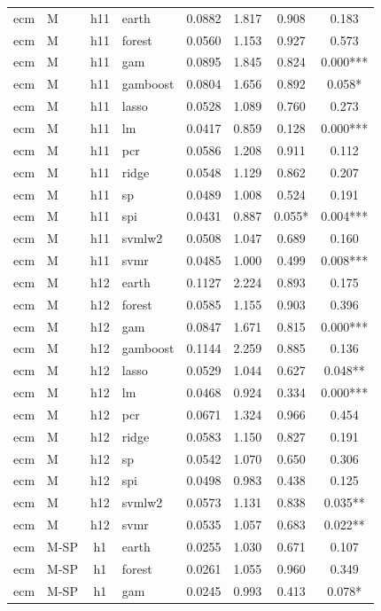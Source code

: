 \begin{ThreePartTable}
\begin{longtable}[t]{llclcccc}
\addlinespace
ecm & M & h11 & earth & 0.0882 & 1.817 & 0.908 & 0.183\\
ecm & M & h11 & forest & 0.0560 & 1.153 & 0.927 & 0.573\\
ecm & M & h11 & gam & 0.0895 & 1.845 & 0.824 & 0.000***\\
ecm & M & h11 & gamboost & 0.0804 & 1.656 & 0.892 & 0.058*\\
ecm & M & h11 & lasso & 0.0528 & 1.089 & 0.760 & 0.273\\
ecm & M & h11 & lm & 0.0417 & 0.859 & 0.128 & 0.000***\\
ecm & M & h11 & pcr & 0.0586 & 1.208 & 0.911 & 0.112\\
ecm & M & h11 & ridge & 0.0548 & 1.129 & 0.862 & 0.207\\
ecm & M & h11 & sp & 0.0489 & 1.008 & 0.524 & 0.191\\
ecm & M & h11 & spi & 0.0431 & 0.887 & 0.055* & 0.004***\\
ecm & M & h11 & svmlw2 & 0.0508 & 1.047 & 0.689 & 0.160\\
ecm & M & h11 & svmr & 0.0485 & 1.000 & 0.499 & 0.008***\\
\addlinespace
ecm & M & h12 & earth & 0.1127 & 2.224 & 0.893 & 0.175\\
ecm & M & h12 & forest & 0.0585 & 1.155 & 0.903 & 0.396\\
ecm & M & h12 & gam & 0.0847 & 1.671 & 0.815 & 0.000***\\
ecm & M & h12 & gamboost & 0.1144 & 2.259 & 0.885 & 0.136\\
ecm & M & h12 & lasso & 0.0529 & 1.044 & 0.627 & 0.048**\\
ecm & M & h12 & lm & 0.0468 & 0.924 & 0.334 & 0.000***\\
ecm & M & h12 & pcr & 0.0671 & 1.324 & 0.966 & 0.454\\
ecm & M & h12 & ridge & 0.0583 & 1.150 & 0.827 & 0.191\\
ecm & M & h12 & sp & 0.0542 & 1.070 & 0.650 & 0.306\\
ecm & M & h12 & spi & 0.0498 & 0.983 & 0.438 & 0.125\\
ecm & M & h12 & svmlw2 & 0.0573 & 1.131 & 0.838 & 0.035**\\
ecm & M & h12 & svmr & 0.0535 & 1.057 & 0.683 & 0.022**\\
\addlinespace
ecm & M-SP & h1 & earth & 0.0255 & 1.030 & 0.671 & 0.107\\
ecm & M-SP & h1 & forest & 0.0261 & 1.055 & 0.960 & 0.349\\
ecm & M-SP & h1 & gam & 0.0245 & 0.993 & 0.413 & 0.078*\\

\end{longtable}
\end{ThreePartTable}
